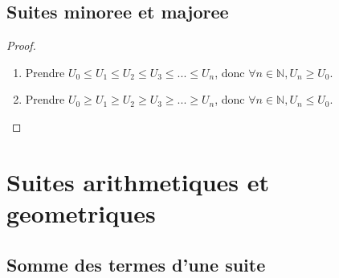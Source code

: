 \documentclass[a4paper,10pt]{book}
\begin{document}
  \subsection{Suites minoree et majoree}
  \label{sub:Suites minoree et majoree}

  \begin{proof}
    \begin{enumerate}
      \item Prendre $U_0 \leq U_1 \leq U_2 \leq U_3 \leq ... \leq U_n$, donc $\forall n \in \mathbb{N}, U_n \geq U_0$.
      \item Prendre $U_0 \geq U_1 \geq U_2 \geq U_3 \geq ... \geq U_n$, donc $\forall n \in \mathbb{N}, U_n \leq U_0$.
    \end{enumerate}
  \end{proof}
  \newpage
  \section{Suites arithmetiques et geometriques}
  \label{sec:Suites arithmetiques et geometriques}

  \subsection{Somme des termes d'une suite}
  \label{sub:Somme des termes d'une suite}
\end{document}
